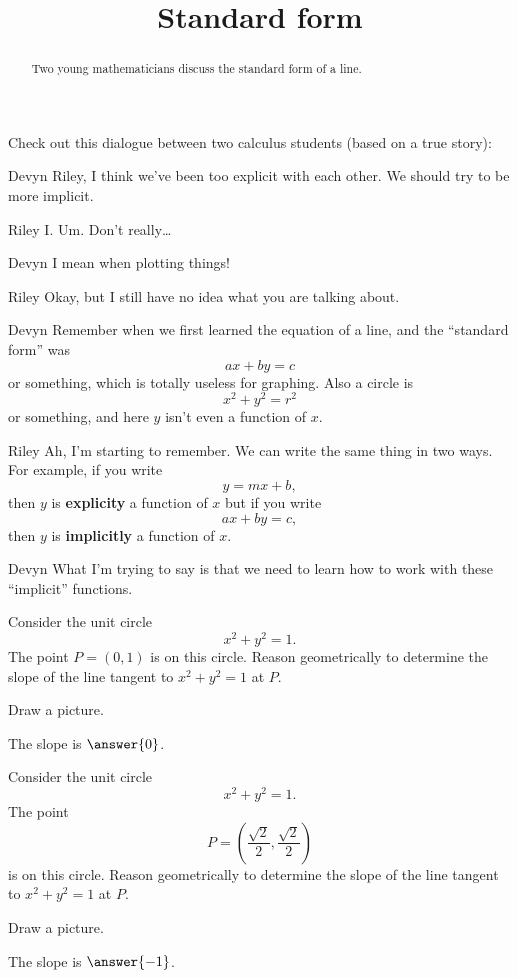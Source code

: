 \documentclass{ximera}
\title[Break-Ground:]{Standard form}
\begin{document}
\begin{abstract}
  Two young mathematicians discuss the standard form of a line.
\end{abstract}
\maketitle

Check out this dialogue between two calculus students (based on a true
story):

\begin{dialogue}
\item[Devyn] Riley, I think we've been too explicit with each
  other. We should try to be more implicit.
\item[Riley] I. Um. Don't really\dots
\item[Devyn] I mean when plotting things!
\item[Riley] Okay, but I still have no idea what you are talking about.
\item[Devyn] Remember when we first learned the equation of a line, and the ``standard form'' was
  \[
  ax+by = c
  \]
  or something, which is totally useless for graphing. Also a circle is
  \[
  x^2 + y^2 = r^2
  \]
  or something, and here $y$ isn't even a function of
  $x$. 
\item[Riley] Ah, I'm starting to remember.  We can write the same thing in two ways.  For example, if you write
  \[
  y = mx + b, %
  \]
 then $y$ is {\bf explicity} a function of $x$ but if you write
    \[
  ax + by = c, %
  \]
  then $y$ is {\bf implicitly} a function of $x$.
\item[Devyn] What I'm trying to say is that we need to learn how to
  work with these ``implicit'' functions. 
\end{dialogue}

\begin{problem}
  Consider the unit circle
  \[
  x^2 + y^2 = 1.
  \]
  The point $P=(0,1)$ is on this circle. Reason geometrically to
  determine the slope of the line tangent to $x^2 + y^2 = 1$ at
  $P$.
  \begin{hint}
    Draw a picture.
  \end{hint}
  \begin{prompt}
    The slope is $\answer{0}$.
  \end{prompt}
\end{problem}

\begin{problem}
  Consider the unit circle
  \[
  x^2 + y^2 = 1.
  \]
  The point
  \[
  P=\left(\frac{\sqrt{2}}{2},\frac{\sqrt{2}}{2}\right)
  \]
  is on this circle. Reason geometrically to determine the slope of
  the line tangent to $x^2 + y^2 = 1$ at $P$.
  \begin{hint}
    Draw a picture.
  \end{hint}
  \begin{prompt}
    The slope is $\answer{-1}$.
  \end{prompt}
\end{problem}




%
\end{document}
